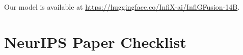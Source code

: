 \documentclass{article}
\begin{document}
Our model is available at  \href{https://huggingface.co/InfiX-ai/InfiGFusion-14B}{https://huggingface.co/InfiX-ai/InfiGFusion-14B}.


\newpage







\section*{NeurIPS Paper Checklist}



\end{document}
